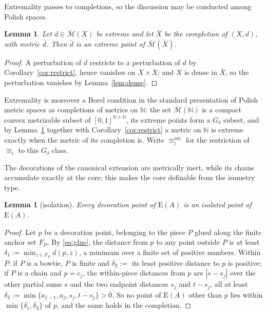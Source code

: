 \documentclass[11pt]{article}
\newtheorem{lemma}[theorem]{Lemma}
\theoremstyle{definition}
\theoremstyle{remark}
\newcommand{\N}{\mathbb{N}}
\newcommand{\bM}{\bar{\mathcal{M}}}
\newcommand{\E}{\mathrm{E}}
\newcommand{\isoi}{\cong_i}
\newcommand{\isox}{\cong_i^{\mathrm{ext}}}
\begin{document}
Extremality passes to completions, so the discussion may be conducted among Polish spaces.

\begin{lemma}\label{lem:completion}
Let $d\in\bM(X)$ be extreme and let $\bar X$ be the completion of $(X,d)$, with metric
$\bar d$. Then $\bar d$ is an extreme point of $\bM(\bar X)$.
\end{lemma}

\begin{proof}
A perturbation of $\bar d$ restricts to a perturbation of $d$ by
Corollary~\ref{cor:restrict}, hence vanishes on $X\times X$; and $X$ is dense in $\bar X$,
so the perturbation vanishes by Lemma~\ref{lem:dense}.
\end{proof}

Extremality is moreover a Borel condition in the standard presentation of Polish metric
spaces as completions of metrics on $\N$: the set $\bM(\N)$ is a compact convex metrizable
subset of $[0,1]^{\N\times\N}$, its extreme points form a $G_\delta$ subset, and by
Lemma~\ref{lem:completion} together with Corollary~\ref{cor:restrict} a metric on $\N$ is
extreme exactly when the metric of its completion is. Write $\isox$ for the restriction of
$\isoi$ to this $G_\delta$ class.

The decorations of the canonical extension are metrically inert, while its chains
accumulate exactly at the core; this makes the core definable from the isometry type.

\begin{lemma}[isolation]\label{lem:isolation}
Every decoration point of $\E(A)$ is an isolated point of $\overline{\E(A)}$.
\end{lemma}

\begin{proof}
Let $p$ be a decoration point, belonging to the piece $P$ glued along the finite anchor set
$F_P$. By \eqref{eq:glue}, the distance from $p$ to any point outside $P$ is at least
$\delta_1:=\min_{z\in F_P}d(p,z)$, a minimum over a finite set of positive numbers. Within
$P$: if $P$ is a bowtie, $P$ is finite and $\delta_2:=$ its least positive distance to $p$
is positive; if $P$ is a chain and $p=c_j$, the within-piece distances from $p$ are
$|s-s_j|$ over the other partial sums $s$ and the two endpoint distances $s_j$ and
$t-s_j$, all at least $\delta_2:=\min\{a_{j-1},a_j,s_j,t-s_j\}>0$. So no point of $\E(A)$
other than $p$ lies within $\min\{\delta_1,\delta_2\}$ of $p$, and the same holds in the
completion.
\end{proof}
\end{document}
